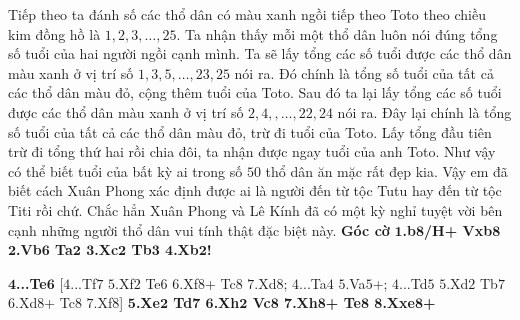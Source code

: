 \begin{multicols}{2}
	Tiếp theo ta đánh số các thổ dân có màu xanh ngồi tiếp theo Toto theo chiều kim đồng hồ là $1, 2, 3,\ldots, 25$. 
	\vskip 0.1cm
	Ta nhận thấy mỗi một thổ dân luôn nói đúng tổng số tuổi của hai người ngồi cạnh mình. Ta sẽ lấy tổng các số tuổi được các thổ dân màu xanh ở vị trí số $1, 3, 5,\ldots, 23, 25$ nói ra. Đó chính là tổng số tuổi của tất cả các thổ dân màu  đỏ, cộng thêm tuổi của Toto. Sau đó ta lại lấy tổng các số tuổi được các thổ dân màu xanh ở vị trí số $2, 4, ,\ldots, 22, 24$ nói ra. Đây lại chính là tổng số tuổi của tất cả các thổ dân màu  đỏ, trừ đi tuổi của Toto. Lấy tổng đầu tiên trừ đi tổng thứ hai rồi chia đôi, ta nhận được ngay tuổi của anh Toto. Như vậy có thể biết tuổi của bất kỳ ai trong số $50$ thổ dân ăn mặc rất đẹp kia.
	\vskip 0.1cm
	Vậy em đã biết cách Xuân Phong xác định được ai là người đến từ tộc Tutu hay đến từ tộc Titi rồi chứ. Chắc hẳn Xuân Phong và Lê Kính đã có một kỳ nghỉ tuyệt vời bên cạnh những người thổ dân vui tính thật đặc biệt này.
	\vskip 0.1cm
	\textbf{\color{toancuabi}Góc cờ}
	\vskip 0.1cm
	\textbf{\color{toancuabi}$\pmb{1}$.b$\pmb{8}$/H+ Vxb$\pmb{8}$ $\pmb{2}$.Vb$\pmb{6}$ Ta$\pmb{2}$ $\pmb{3}$.Xc$\pmb{2}$ Tb$\pmb{3}$ $\pmb{4}$.Xb$\pmb{2}$!}
	\begin{center}
		\newgame
		\scalebox{0.85}\showboard
	\end{center}
	\textbf{\color{toancuabi}$\pmb{4}$...Te$\pmb{6}$} [$4$...Tf$7$ $5$.Xf$2$ Te$6$ $6$.Xf$8$+ Tc$8$ $7$.Xd$8$; $4$...Ta$4$ $5$.Va$5$+; $4$...Td$5$ $5$.Xd$2$ Tb$7$ $6$.Xd$8$+ Tc$8$ $7$.Xf$8$]
	\vskip 0.1cm
	\textbf{\color{toancuabi}$\pmb{5}$.Xe$\pmb{2}$ Td$\pmb{7}$ $\pmb{6}$.Xh$\pmb{2}$ Vc$\pmb{8}$ $\pmb{7}$.Xh$\pmb{8}$+ Te$\pmb{8}$ $\pmb{8}$.Xxe$\pmb{8}$+}
\end{multicols}